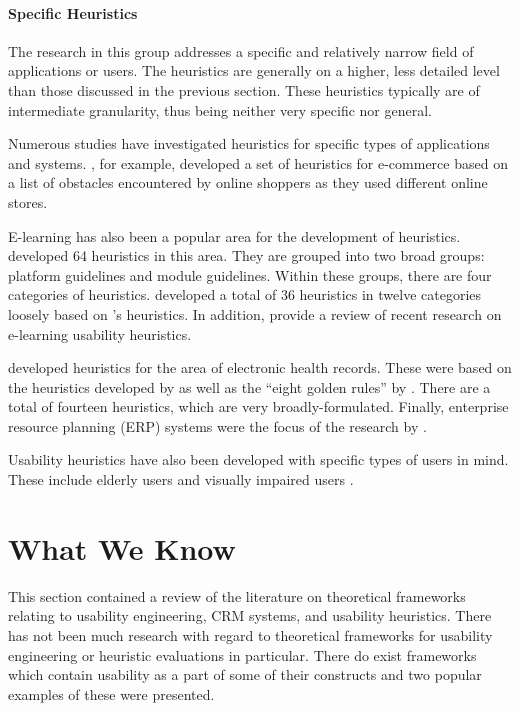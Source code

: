 \paragraph{Specific Heuristics}
The research in this group addresses a specific and relatively narrow field of applications or users. The heuristics are generally on a higher, less detailed level than those discussed in the previous section. These heuristics typically are of intermediate granularity, thus being neither very specific nor general.

Numerous studies have investigated heuristics for specific types of applications and systems. , for example, developed a set of heuristics for e-commerce based on a list of obstacles encountered by online shoppers as they used different online stores.

E-learning has also been a popular area for the development of heuristics.  developed 64 heuristics in this area. They are grouped into two broad groups: platform guidelines and module guidelines. Within these groups, there are four categories of heuristics.  developed a total of 36 heuristics in twelve categories loosely based on \citeauthor{Nielsen1994a}'s heuristics. In addition, \citet{Freire2012} provide a review of recent research on e-learning usability heuristics.

\citet{Zhang2011} developed heuristics for the area of electronic health records. These were based on the heuristics developed by \citet{Nielsen1993} as well as the ``eight golden rules'' by \citet{Shneiderman1998}. There are a total of fourteen heuristics, which are very broadly-formulated. Finally, enterprise resource planning (ERP) systems were the focus of the research by \citet{Singh2009}.

Usability heuristics have also been developed with specific types of users in mind. These include elderly users \citep[e.g.][]{AARP2004,Redish2004} and visually impaired users \citep[e.g.][]{Harper2003}.

\section{What We Know}
This section contained a review of the literature on theoretical frameworks relating to usability engineering, CRM systems, and usability heuristics. There has not been much research with regard to theoretical frameworks for usability engineering or heuristic evaluations in particular. There do exist frameworks which contain usability as a part of some of their constructs and two popular examples of these were presented.

